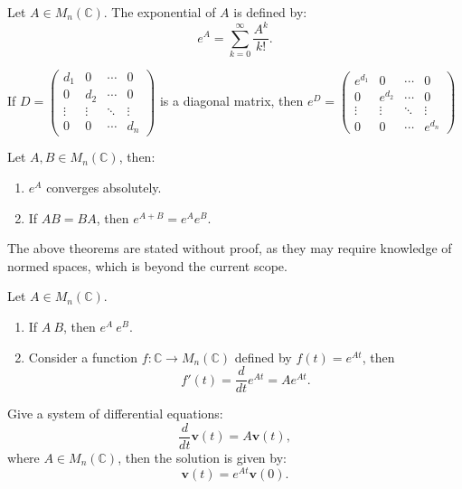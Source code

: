 \documentclass[12pt]{article}
\begin{document}
\begin{definition}
    Let $A\in M_n(\mathbb{C})$. The exponential of $A$ is defined by:
    \[e^{A}=\sum_{k=0}^{\infty}\frac{A^k}{k!}.\]
\end{definition}

\begin{theorem}
    If $D=\begin{pmatrix}
        d_1 & 0 & \cdots & 0\\
        0 & d_2 & \cdots & 0\\
        \vdots & \vdots & \ddots & \vdots\\
        0 & 0 & \cdots & d_n \end{pmatrix}$ is a diagonal matrix,
    then $e^D=\begin{pmatrix}
        e^{d_1} & 0 & \cdots & 0\\
        0 & e^{d_2} & \cdots & 0\\
        \vdots & \vdots & \ddots & \vdots\\
        0 & 0 & \cdots & e^{d_n} \end{pmatrix}$
\end{theorem}


\begin{theorem}
    Let $A,B\in M_n(\mathbb{C})$, then:
    \begin{enumerate}
        \item $e^A$ converges absolutely.
        \item If $AB=BA$, then $e^{A+B}=e^Ae^B$.
    \end{enumerate}
\end{theorem}

\begin{pf}
    The above theorems are stated without proof, as they may require knowledge of normed spaces, which is beyond the current scope.
\end{pf}

\begin{theorem}
    Let $A\in M_n(\mathbb{C})$.
    \begin{enumerate}
        \item If $A~B$, then $e^A ~ e^B$.
        \item Consider a function $f:\mathbb{C}\rightarrow M_n(\mathbb{C})$ defined by $f(t)=e^{At}$, then
        \[f'(t)=\frac{d}{dt}e^{At}=Ae^{At}.\]
    \end{enumerate}
\end{theorem}

\begin{corollary}
    Give a system of differential equations:
    \[\frac{d}{dt}\mathbf{v}(t)=A\mathbf{v}(t),\]
    where $A\in M_n(\mathbb{C})$, then the solution is given by:
    \[\mathbf{v}(t)=e^{At}\mathbf{v}(0).\]
\end{corollary}
\end{document}
